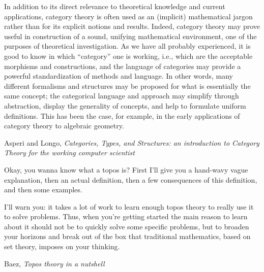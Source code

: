 \documentclass[11pt,openany]{article}
\begin{document}
\epigraph{In addition to its direct relevance to theoretical knowledge and current applications, category theory
is often used as an (implicit) mathematical jargon rather than for its explicit notions and results.
Indeed, category theory may prove useful in construction of a sound, unifying mathematical
environment, one of the purposes of theoretical investigation. As we have all probably experienced, it
is good to know in which “category” one is working, i.e., which are the acceptable morphisms and
constructions, and the language of categories may provide a powerful standardization of methods and
language. In other words, many different formalisms and structures may be proposed for what is
essentially the same concept; the categorical language and approach may simplify through abstraction,
display the generality of concepts, and help to formulate uniform definitions. This has been the case,
for example, in the early applications of category theory to algebraic geometry.}
{Asperi and Longo, \textit{Categories, Types, and Structures: 
an introduction to Category Theory for the working computer scientist}~\cite{asperti-longo-1991}}

\epigraph{Okay, you wanna know what a topos is? 
First I'll give you a hand-wavy vague explanation, 
then an actual definition, 
then a few consequences of this definition, 
and then some examples.
\par
I'll warn you: 
it takes a lot of work to learn enough topos theory 
to really use it to solve problems. 
Thus, when you're getting started the main reason to learn 
about it should not be to quickly solve some specific problems, 
but to broaden your horizons and break out of the box 
that traditional mathematics, based on set theory, 
imposes on your thinking.}
{Baez, \textit{Topos theory in a 
nutshell}~\cite{baez-2017-topos-theory-nutshell}}

\pagebreak
\end{document}
